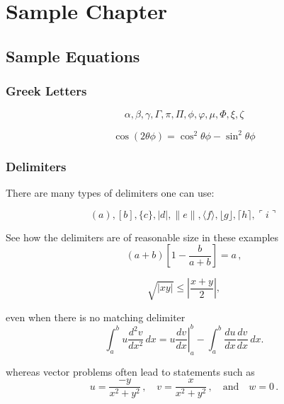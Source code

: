 \chapter{Sample Chapter}
\lipsum[4]

\section{Sample Equations}
\lipsum[4] 

\subsection{Greek Letters}

\begin{equation*} 
        \alpha,  \beta,  \gamma, \Gamma, \pi, \Pi, \phi, \varphi, \mu, \Phi, \xi, \zeta 
\end{equation*}

\begin{equation} 
        \cos(2\theta\phi) = \cos^2 \theta\phi - \sin^2 \theta\phi 
\end{equation}

\subsection{Delimiters}
There are many types of delimiters one can use:

\begin{equation*} 
        ( a ), [ b ], \{ c \}, | d |, \| e \|,
        \langle f \rangle, \lfloor g \rfloor,
        \lceil h \rceil, \ulcorner i \urcorner 
\end{equation*}

See how the delimiters are of reasonable size in these examples
\begin{equation}
        \left(a+b\right)\left[1-\frac{b}{a+b}\right]=a\,,
\end{equation}

\begin{equation}
        \sqrt{|xy|}\leq\left|\frac{x+y}{2}\right|,
\end{equation}

even when there is no matching delimiter
\begin{equation}
        \int_a^bu\frac{d^2v}{dx^2}\,dx
        =\left.u\frac{dv}{dx}\right|_a^b
        -\int_a^b\frac{du}{dx}\frac{dv}{dx}\,dx.
\end{equation}

whereas vector problems often lead to statements such as
\begin{equation}
        u=\frac{-y}{x^2+y^2}\,,\quad
        v=\frac{x}{x^2+y^2}\,,\quad\text{and}\quad
        w=0\,.
\end{equation}

